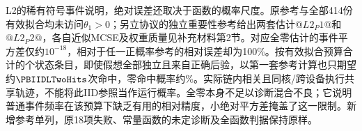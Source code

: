 L2的稀有符号事件说明，绝对误差还取决于函数的概率尺度。原参考与全部414份有效拟合均未访问$\theta_1>0$；另立协议的独立重要性参考给出两套估计$@L2_P1@$和$@L2_P2@$，各自近似MCSE及权重质量见补充材料第2节。对应全零估计的事件平方差仅约$10^{-18}$，相对于任一正概率参考的相对误差却为100\%。按有效拟合预算合计的\PBIIDLTwoStates{}个状态条目，即使假想全部独立且来自正确后验，以第一套参考计算也只期望约$\PBIIDLTwoHits$次命中，零命中概率约\PBIIDLTwoZero\%。实际链内相关且同核/跨设备执行共享轨迹，不能将此IID参照当作运行概率。全零本身不足以诊断混合不良；它说明普通事件频率在该预算下缺乏有用的相对精度，小绝对平方差掩盖了这一限制。新增参考单列，原18项失败、常量函数的未定诊断及全函数判据保持原样。

